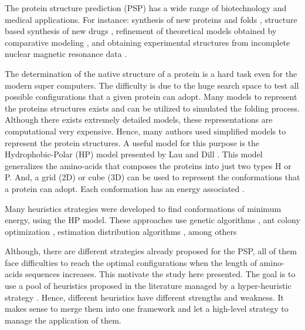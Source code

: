 \documentclass[conference]{IEEEtran}
\begin{document}
The protein structure prediction (PSP) has a wide range of biotechnology and medical applications. For instance: synthesis of new proteins and folds \cite{wang2012structural}, structure based synthesis of new drugs \cite{davis2009rosettaligand}, refinement of theoretical models obtained by comparative modeling \cite{qian2004improvement, krieger2009improving}, and
obtaining experimental structures from incomplete nuclear magnetic
resonance data  \cite{shen2009novo}.  

The determination of the native structure of a protein is a hard task even for the modern super computers. The difficulty is due to the huge search space to test all possible configurations that a given protein can adopt. Many models to represent the proteins structures exists and can be utilized to simulated the folding process. Although there exists extremely detailed models, these representations are computational very expensive. Hence, many authors \cite{custodio2004investigation,hsu2003growth,lin2011protein,unger1993genetic,santana2008protein,custodio2014multiple, garza2012locality} used simplified models to represent the protein structures. A useful model for this purpose is the Hydrophobic-Polar (HP) model presented by Lau and Dill \cite{lau1989lattice}. This model generalizes the amino-acids that composes the proteins into just two types H or P. And, a grid (2D) or cube (3D) can be used to represent the conformations that a protein can adopt. Each conformation has an energy associated \cite{unger1993genetic}. 


Many heuristics strategies were developed to find conformations of minimum energy, using the HP model. These approaches use genetic algorithms \cite{unger1993genetic}, ant colony optimization \cite{shmygelska2002ant, shmygelska2003improved}, estimation distribution algorithms \cite{santana2008protein }, among others\cite{gabriel2012algoritmos}

 Although, there are different strategies already proposed for the PSP, all of them face difficulties to reach the optimal configurations when the length of amino-acids sequences increases. This motivate the study here presented. The goal is to use a pool of heuristics proposed in the literature managed by a hyper-heuristic strategy \cite{burke2013hyper}.  Hence, different heuristics have different strengths and weakness. It makes sense to merge them into one framework and let a high-level strategy to manage the application of them. 
\end{document}
